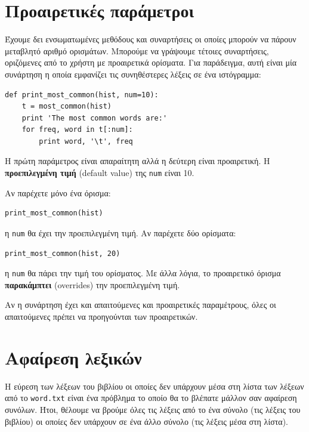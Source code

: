 \documentclass[10pt]{book}
\begin{document}
 
\section{Προαιρετικές παράμετροι}

Έχουμε δει ενσωματωμένες μεθόδους και συναρτήσεις οι οποίες μπορούν να πάρουν μεταβλητό αριθμό ορισμάτων. 
Μπορούμε να γράψουμε τέτοιες συναρτήσεις, οριζόμενες από το χρήστη με προαιρετικά ορίσματα. Για παράδειγμα, αυτή είναι μία συνάρτηση η οποία εμφανίζει τις συνηθέστερες λέξεις σε ένα ιστόγραμμα:

\begin{verbatim}
def print_most_common(hist, num=10):
    t = most_common(hist)
    print 'The most common words are:'
    for freq, word in t[:num]:
        print word, '\t', freq
\end{verbatim}

Η πρώτη παράμετρος είναι απαραίτητη αλλά η δεύτερη είναι προαιρετική. Η {\bf προεπιλεγμένη τιμή} (default value) της {\tt num} είναι 10.

Αν παρέχετε μόνο ένα όρισμα:

\begin{verbatim}
print_most_common(hist)
\end{verbatim}

η {\tt num} θα έχει την προεπιλεγμένη τιμή. Αν παρέχετε δύο ορίσματα:

\begin{verbatim}
print_most_common(hist, 20)
\end{verbatim}

η {\tt num} θα πάρει την τιμή του ορίσματος. Με άλλα λόγια, το προαιρετικό όρισμα {\bf παρακάμπτει} (overrides) την προεπιλεγμένη τιμή.

Αν η συνάρτηση έχει και απαιτούμενες και προαιρετικές παραμέτρους, όλες οι απαιτούμενες πρέπει να προηγούνται των προαιρετικών.


\section{Αφαίρεση λεξικών}

Η εύρεση των λέξεων του βιβλίου οι οποίες δεν υπάρχουν μέσα στη λίστα των λέξεων από το {\tt word.txt} είναι ένα 
πρόβλημα το οποίο θα το βλέπατε μάλλον σαν αφαίρεση συνόλων. Ήτοι, θέλουμε να βρούμε όλες τις λέξεις από το ένα σύνολο (τις λέξεις του βιβλίου) οι οποίες δεν υπάρχουν σε ένα άλλο σύνολο (τις λέξεις μέσα στη λίστα). 
\end{document}
